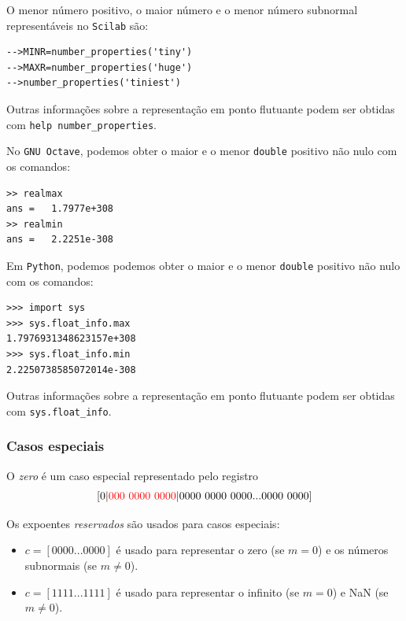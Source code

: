 \ifisscilab
\begin{obs}
  O menor número positivo, o maior número e o menor número subnormal representáveis  no \verb+Scilab+ são:
\begin{verbatim}
-->MINR=number_properties('tiny')
-->MAXR=number_properties('huge')
-->number_properties('tiniest')
\end{verbatim}
Outras informações sobre a representação em ponto flutuante podem ser obtidas com \verb+help number_properties+.
\end{obs}
\fi
\ifisoctave
\begin{obs}
  No \verb+GNU Octave+, podemos obter o maior e o menor \verb+double+ positivo não nulo com os comandos:
\begin{verbatim}
>> realmax
ans =   1.7977e+308
>> realmin
ans =   2.2251e-308
\end{verbatim}
\end{obs}
\fi
\ifispython
\begin{obs}
  Em \verb+Python+, podemos podemos obter o maior e o menor \verb+double+ positivo não nulo com os comandos:
\begin{verbatim}
>>> import sys
>>> sys.float_info.max
1.7976931348623157e+308
>>> sys.float_info.min
2.2250738585072014e-308
\end{verbatim}
Outras informações sobre a representação em ponto flutuante podem ser obtidas com \verb+sys.float_info+.
\end{obs}
\fi

\subsubsection{Casos especiais}
O \emph{zero} é um caso especial representado pelo registro
$$
[0|{\color{red}{000~0000~0000}} |0000~0000~0000...0000~0000]
$$

Os expoentes \emph{reservados} são usados para casos especiais:
\begin{itemize}
 \item $c=[0000...0000]$ é usado para representar o zero (se $m=0$) e os números subnormais (se $m\neq 0$).
 \item $c=[1111...1111]$ é usado para representar o infinito (se $m=0$) e NaN (se $m\neq 0$).
\end{itemize}

